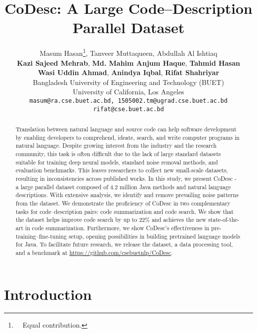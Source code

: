 \documentclass[11pt,a4paper]{article}
\title{CoDesc: A Large Code--Description Parallel Dataset}
\author{
Masum Hasan\thanks{~~Equal contribution.}, Tanveer Muttaqueen\footnotemark[1], Abdullah Al Ishtiaq \\
\textbf{Kazi Sajeed Mehrab}, \textbf{Md. Mahim Anjum Haque}, \textbf{Tahmid Hasan} \\
\textbf{Wasi Uddin Ahmad}, \textbf{Anindya Iqbal}, \textbf{Rifat Shahriyar}\\ [3pt]
Bangladesh University of Engineering and Technology (BUET)\\University of California, Los Angeles\\ [3pt]
\texttt{masum@ra.cse.buet.ac.bd, 1505002.tm@ugrad.cse.buet.ac.bd}\\
\texttt{rifat@cse.buet.ac.bd}
}
\date{}
\begin{document}
\maketitle
\begin{abstract}




Translation between natural language and source code can help software development by enabling developers to comprehend, ideate, search, and write computer programs in natural language.
Despite growing interest from the industry and the research community, this task is often difficult due to the lack of large standard datasets suitable for training deep neural models, standard noise removal methods, and evaluation benchmarks. This leaves researchers to collect new small-scale datasets, resulting in inconsistencies across published works.
In this study, we present CoDesc - a large parallel dataset composed of 4.2 million Java methods and natural language descriptions. With extensive analysis, we identify and remove prevailing noise patterns from the dataset. We demonstrate the proficiency of CoDesc in two complementary tasks for code--description pairs: code summarization and code search. We show that the dataset helps improve code search by up to 22\% and achieves the new state-of-the-art in code summarization. Furthermore, we show CoDesc's effectiveness in pre-training--fine-tuning setup, opening possibilities in building pretrained language models for Java. To facilitate future research, we release the dataset, a data processing tool, and a benchmark at \href{https://github.com/csebuetnlp/CoDesc}{https://github.com/csebuetnlp/CoDesc}.











%
 \end{abstract}


\section{Introduction}
\label{sec:introduction}
\end{document}
